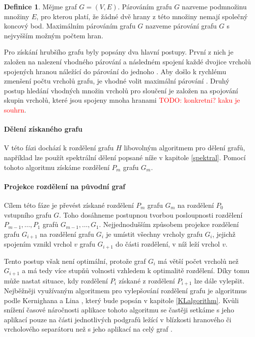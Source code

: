 \documentclass[11pt,american,czech,oneside]{book}
\theoremstyle{plain}
\theoremstyle{definition}
\newtheorem{definition}{Definice}
\newcommand{\TODO}[1]{\textcolor{red}{TODO: #1}}
\begin{document}
\begin{definition}
  Mějme graf $G = (V, E)$. Párováním grafu $G$ nazveme podmnožinu množiny $E$, pro kterou platí, že žádné dvě hrany z této množiny nemají společný koncový bod. Maximálním párováním grafu $G$ nazveme párování grafu $G$ s nejvyšším možným počtem hran.
\end{definition}

Pro získání hrubšího grafu byly popsány dva hlavní postupy. První z nich je založen na nalezení vhodného párování a následném spojení každé dvojice vrcholů spojených hranou náležící do párování do jednoho \cite{edmo:65,lawl:76}. Aby došlo k rychlému zmenšení počtu vrcholů grafu, je vhodné volit maximální párování \cite{hele:95}. Druhý postup hledání vhodných množin vrcholů pro sloučení je založen na spojování skupin vrcholů, které jsou spojeny mnoha hranami \cite{kaku:98} \TODO{konkretni? kaku je souhrn}.

\paragraph{Dělení získaného grafu}
V této fázi dochází k rozdělení grafu $H$ libovolným algoritmem pro dělení grafů, například lze použít spektrální dělení popsané níže v kapitole \ref{spektral}. Pomocí tohoto algoritmu získáme rozdělení $P_m$ grafu $G_m$.

\paragraph{Projekce rozdělení na původní graf}
Cílem této fáze je převést získané rozdělení $P_m$ grafu $G_m$ na rozdělení $P_0$ vstupního grafu $G$. Toho dosáhneme postupnou tvorbou posloupnosti rozdělení $P_{m-1}, \ldots, P_1$ grafů $G_{m-1}, \ldots, G_1$. Nejjednodušším způsobem projekce rozdělení grafu $G_{i+1}$ na rozdělení grafu $G_i$ je umístit všechny vrcholy grafu $G_i$, jejichž spojením vznikl vrchol $v$ grafu $G_{i+1}$ do části rozdělení, v níž leží vrchol $v$.

Tento postup však není optimální, protože graf $G_i$ má větší počet vrcholů než $G_{i+1}$ a má tedy více stupňů volnosti vzhledem k optimalitě rozdělení. Díky tomu může nastat situace, kdy rozdělení $P_i$ získané z rozdělení $P_{i+1}$ lze dále vylepšit. Nejběžněji využívaným algoritmem pro vylepšování rozdělení grafu je algoritmus podle Kernighana a Lina \cite{keli:70}, který bude popsán v kapitole \ref{KLalgorithm}. Kvůli snížení časové náročnosti aplikace tohoto algoritmu se častěji setkáme s jeho aplikací pouze na části jednotlivých podgrafů ležící v blízkosti hranového či vrcholového separátoru než s jeho aplikací na celý graf \cite{kaku:98}.
\end{document}
